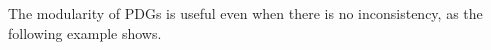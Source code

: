 \documentclass{article}
\newcommand{\commentout}[1]{\ignorespaces}
\newcommand{\MN}{PDG}
\newcommand{\MNs}{\MN s}
\numberwithin{equation}{section}
\begin{document}
The modularity of PDGs is useful even when there is no
inconsistency, as the following example shows. 
\commentout{The modularity of PDGs is useful even when there is no inconsistency, as the following example shows. } 
\end{document}

